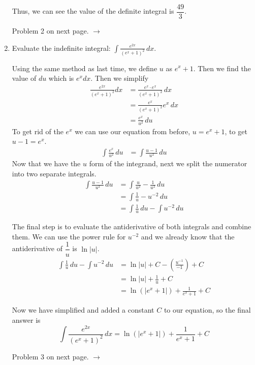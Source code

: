 \documentclass{article}
\begin{document}
\begin{enumerate}[label=\textbf{(3.\arabic*)}]
Thus, we can see the value of the definite integral is $\dfrac{49}{3}$.
\newline
\begin{center}
Problem 2 on next page. $\rightarrow$
\end{center}

\newpage %

\item Evaluate the indefinite integral: $\displaystyle{ \int\!\frac{e^{2x}}{\left(e^x+1\right)^2}\,dx}$.

Using the same method as last time, we define $u$ as $e^x+1$. Then we find the value of $du$ which is $e^xdx$. Then we simplify
\begin{align*}
\frac{e^{2x}}{\left(e^x+1\right)^2}dx &= \frac{e^x\cdot e^x}{\left(e^x+1\right)^2} \,dx \\
&= \frac{e^x}{\left(e^x+1\right)^2}e^x\,dx \\
&=\frac{e^x}{u^2}\,du
\end{align*}
To get rid of the $e^x$ we can use our equation from before, $u=e^x+1$, to get $u-1=e^x$.
\begin{align*}
\int\!\frac{e^x}{u^2}\,du &= \int\!\frac{u-1}{u^2}\,du
\end{align*}
Now that we have the $u$ form of the integrand, next we split the numerator into two separate integrals.
\begin{align*}
\int\!\frac{u-1}{u^2}\,du &= \int\!\frac{u}{u^2}-\frac{1}{u^2}\,du \\
&=\int\!\frac{1}{u}-u^{-2}\,du \\
&=\int\!\frac{1}{u}\,du-\int\!u^{-2}\,du
\end{align*}

The final step is to evaluate the antiderivative of both integrals and combine them. We can use the power rule for $u^{-2}$ and we already know that the antiderivative of $\dfrac{1}{u}$ is $\ln|u|$.
\begin{align*}
\int\!\frac{1}{u}\,du-\int\!u^{-2}\,du &= \ln|u|+C-\left(\frac{u^{-1}}{-1}\right)+C \\
&= \ln|u|+\frac{1}{u}+C \\
&= \ln\left(\left|e^x+1\right|\right)+\frac{1}{e^x+1}+C
\end{align*}

Now we have simplified and added a constant $C$ to our equation, so the final answer is
\[\int\!\frac{e^{2x}}{\left(e^x+1\right)^2}\,dx=\ln\left(\left|e^x+1\right|\right)+\frac{1}{e^x+1}+C\]
\newline
\begin{center}
Problem 3 on next page. $\rightarrow$
\end{center}


\end{enumerate}
\end{document}
